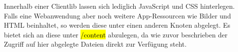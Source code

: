 Innerhalb einer Clientlib lassen sich lediglich JavaScript und CSS hinterlegen. Falls eine Webanwendung aber noch weitere App-Ressourcen wie Bilder und HTML beinhaltet, so werden diese unter einen anderen Knoten abgelegt. Es bietet sich an diese unter \hl{/content} abzulegen, da wie zuvor beschrieben der Zugriff auf hier abgelegte Dateien direkt zur Verfügung steht.
